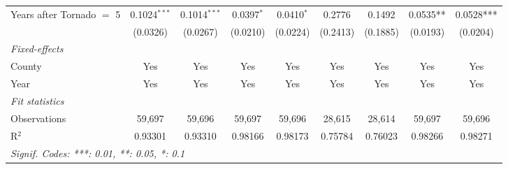 \documentclass[letterpaper]{article}
\begin{document}
\begin{table}[H]
\begin{tabular}{lcccccccc}
   Years after Tornado $=$ 5  & 0.1024$^{***}$  & 0.1014$^{***}$  & 0.0397$^{*}$    & 0.0410$^{*}$    & 0.2776         & 0.1492 & 0.0535** & 0.0528***\\   
   & (0.0326)        & (0.0267)        & (0.0210)        & (0.0224)        & (0.2413)       & (0.1885) & (0.0193) & (0.0204)\\   
   \midrule
   \emph{Fixed-effects}\\
   County                                    & Yes             & Yes             & Yes             & Yes             & Yes            & Yes & Yes            & Yes\\  
   Year                                      & Yes             & Yes             & Yes             & Yes             & Yes            & Yes & Yes            & Yes\\  
   \midrule
   \emph{Fit statistics}\\
   Observations                              & 59,697          & 59,696          & 59,697          & 59,696 &         28,615 & 28,614 & 59,697         & 59,696\\  
   R$^2$                                     & 0.93301         & 0.93310         & 0.98166         & 0.98173         & 0.75784        & 0.76023 & 0.98266 & 0.98271 \\   
   \midrule \midrule
   \multicolumn{7}{l}{\emph{Signif. Codes: ***: 0.01, **: 0.05, *: 0.1}}\\
   
\end{tabular}
\end{table}

\end{document}
